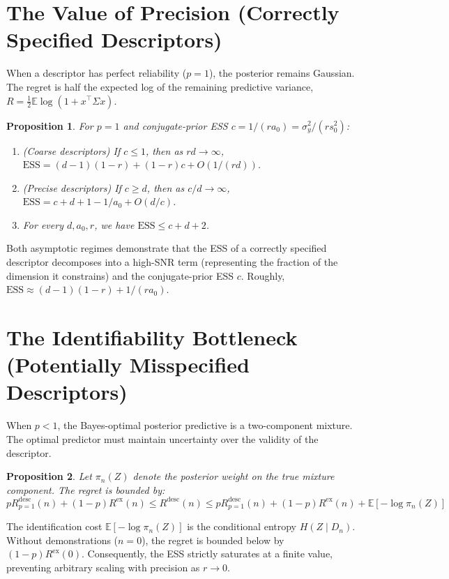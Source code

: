\documentclass{article}
\newtheorem{proposition}{Proposition}
\begin{document}
\section{The Value of Precision (Correctly Specified Descriptors)}
When a descriptor has perfect reliability ($p=1$), the posterior remains Gaussian. The regret is half the expected log of the remaining predictive variance, $R = \frac{1}{2}\mathbb{E} \log(1 + x^\top \Sigma x)$.

\begin{proposition} \label{prop:reliable}
For $p=1$ and conjugate-prior ESS $c = 1/(ra_0) = \sigma_y^2 / (rs_0^2)$:
\begin{enumerate}
    \item (Coarse descriptors) If $c \le 1$, then as $rd \to \infty$, $\text{ESS} = (d-1)(1-r) + (1-r)c + O(1/(rd))$.
    \item (Precise descriptors) If $c \ge d$, then as $c/d \to \infty$, $\text{ESS} = c + d + 1 - 1/a_0 + O(d/c)$.
    \item For every $d, a_0, r$, we have $\text{ESS} \le c + d + 2$.
\end{enumerate}
\end{proposition}
Both asymptotic regimes demonstrate that the ESS of a correctly specified descriptor decomposes into a high-SNR term (representing the fraction of the dimension it constrains) and the conjugate-prior ESS $c$. Roughly, $\text{ESS} \approx (d-1)(1-r) + 1/(ra_0)$.

\section{The Identifiability Bottleneck (Potentially Misspecified Descriptors)}
When $p < 1$, the Bayes-optimal posterior predictive is a two-component mixture. The optimal predictor must maintain uncertainty over the validity of the descriptor.

\begin{proposition} \label{prop:unreliable}
Let $\pi_n(Z)$ denote the posterior weight on the true mixture component. The regret is bounded by:
\begin{equation}
    p R^{\text{desc}}_{p=1}(n) + (1-p) R^{\text{ex}}(n) \le R^{\text{desc}}(n) \le p R^{\text{desc}}_{p=1}(n) + (1-p) R^{\text{ex}}(n) + \mathbb{E}[-\log \pi_n(Z)]
\end{equation}
\end{proposition}
The identification cost $\mathbb{E}[-\log \pi_n(Z)]$ is the conditional entropy $H(Z \mid D_n)$. Without demonstrations ($n=0$), the regret is bounded below by $(1-p)R^{\text{ex}}(0)$. Consequently, the ESS strictly saturates at a finite value, preventing arbitrary scaling with precision as $r \to 0$.
\end{document}
